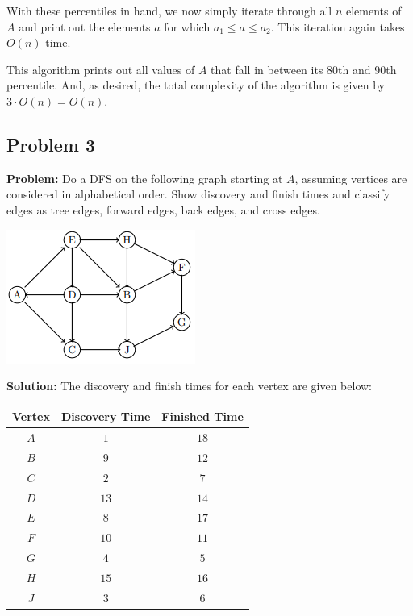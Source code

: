 \documentclass{article}
\begin{document}
With these percentiles in hand, we now simply iterate through all $n$ elements of $A$ and print out the elements $a$ for which $a_1\le a\le a_2$. This iteration again takes $O(n)$ time.

This algorithm prints out all values of $A$ that fall in between its 80th and 90th percentile. And, as desired, the total complexity of the algorithm is given by $3\cdot O(n)=O(n)$.


\subsection*{Problem 3}
\noindent\textbf{Problem:} Do a DFS on the following graph starting at $A$, assuming vertices are considered in alphabetical order. Show discovery and finish times and classify edges as tree edges, forward edges, back edges, and cross edges.
\begin{center}
  \includegraphics{graph3.png}
\end{center}

\noindent\textbf{Solution:} The discovery and finish times for each vertex are given below:
\begin{center}
  \begin{tabular}{c|c|c}
        Vertex & Discovery Time & Finished Time \\
        \hline
        $A$ & $1$ & $18$\\
        $B$ & $9$ & $12$\\
        $C$ & $2$ & $7$\\
        $D$ & $13$ & $14$\\
        $E$ & $8$ & $17$\\
        $F$ & $10$ & $11$\\
        $G$ & $4$ & $5$\\
        $H$ & $15$ & $16$\\
        $J$ & $3$ & $6$
  \end{tabular}
\end{center}
\medskip
\end{document}
